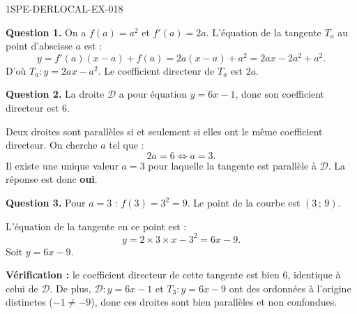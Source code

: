 \begin{corrige}{1SPE-DERLOCAL-EX-018}

\textbf{Question 1.} On a $f(a) = a^2$ et $f'(a) = 2a$. L'équation de la tangente $T_a$ au point d'abscisse $a$ est :
\[
y = f'(a)(x - a) + f(a) = 2a(x - a) + a^2 = 2ax - 2a^2 + a^2.
\]
D'où $T_a : y = 2ax - a^2$. Le coefficient directeur de $T_a$ est $\boxed{2a}$.

\textbf{Question 2.} La droite $\mathcal{D}$ a pour équation $y = 6x - 1$, donc son coefficient directeur est $6$.

Deux droites sont parallèles si et seulement si elles ont le même coefficient directeur. On cherche $a$ tel que :
\[
2a = 6 \iff a = 3.
\]
Il existe une unique valeur $a = 3$ pour laquelle la tangente est parallèle à $\mathcal{D}$. La réponse est donc \textbf{oui}.

\textbf{Question 3.} Pour $a = 3$ : $f(3) = 3^2 = 9$. Le point de la courbe est $\boxed{(3\,;\,9)}$.

L'équation de la tangente en ce point est :
\[
y = 2 \times 3 \times x - 3^2 = 6x - 9.
\]
Soit $\boxed{y = 6x - 9}$.

\textbf{Vérification :} le coefficient directeur de cette tangente est bien $6$, identique à celui de $\mathcal{D}$. De plus, $\mathcal{D} : y = 6x - 1$ et $T_3 : y = 6x - 9$ ont des ordonnées à l'origine distinctes ($-1
\neq -9$), donc ces droites sont bien parallèles et non confondues. \checkmark

\end{corrige}

